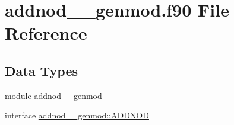 \hypertarget{addnod____genmod_8f90}{\section{addnod\+\_\+\+\_\+genmod.\+f90 File Reference}
\label{addnod____genmod_8f90}
}
\subsection*{Data Types}
\begin{DoxyCompactItemize}
\item 
module \hyperlink{classaddnod____genmod}{addnod\+\_\+\+\_\+genmod}
\item 
interface \hyperlink{interfaceaddnod____genmod_1_1ADDNOD}{addnod\+\_\+\+\_\+genmod\+::\+A\+D\+D\+N\+O\+D}
\end{DoxyCompactItemize}
